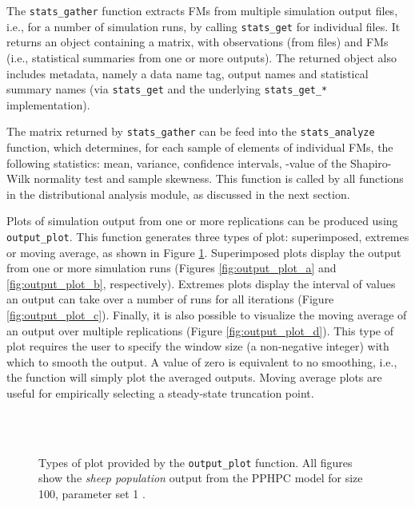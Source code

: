 \documentclass{article}
\newcommand{\progfunc}{\textnhtt}
\begin{document}
The \progfunc{stats\_gather} function extracts FMs from multiple simulation output files, i.e., for a number of simulation runs, by calling \progfunc{stats\_get} for individual files. It returns an object containing a  matrix, with  observations (from  files) and  FMs (i.e., statistical summaries from one or more outputs). The returned object also includes metadata, namely a data name tag, output names and statistical summary names (via \progfunc{stats\_get} and the underlying \progfunc{stats\_get\_*} implementation).

The matrix returned by \progfunc{stats\_gather} can be feed into the \progfunc{stats\_analyze} function, which determines, for each sample of  elements of individual FMs, the following statistics: mean, variance, confidence intervals, -value of the Shapiro-Wilk normality test \cite{shapiro1965analysis} and sample skewness. This function is called by all functions in the distributional analysis module, as discussed in the next section.

Plots of simulation output from one or more replications can be produced using \progfunc{output\_plot}. This function generates three types of plot: superimposed, extremes or moving average, as shown in Figure \ref{fig:output_plot}. Superimposed plots display the output from one or more simulation runs (Figures \ref{fig:output_plot_a} and \ref{fig:output_plot_b}, respectively). Extremes plots display the interval of values an output can take over a number of runs for all iterations (Figure \ref{fig:output_plot_c}). Finally, it is also possible to visualize the moving average of an output over multiple replications (Figure \ref{fig:output_plot_d}). This type of plot requires the user to specify the window size (a non-negative integer) with which to smooth the output. A value of zero is equivalent to no smoothing, i.e., the function will simply plot the averaged outputs. Moving average plots are useful for empirically selecting a steady-state truncation point.

\begin{figure}[ht]
	\centering
	
	\quad
	 \\
	\quad
	 \\
	\caption{Types of plot provided by the \progfunc{output\_plot} function. All figures show the \textit{sheep population} output from the PPHPC model for size 100, parameter set 1 \cite{fachada2015template}.}
	\label{fig:output_plot}
\end{figure}
\end{document}
